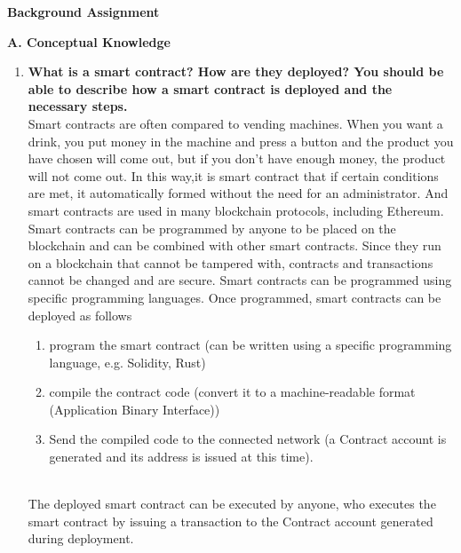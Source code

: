 \documentclass[a4paper,10pt]{jsarticle}
\begin{document}
  \begin{flushright}
    \textbf{\large{Background Assignment}}
  \end{flushright}
  \begin{center}
    \textbf{\large{A. Conceptual Knowledge}}
  \end{center}
  \begin{enumerate}
    \item \textbf{\large{What is a smart contract? How are they deployed? You should be able to describe how a smart contract is deployed and the necessary steps.}}\mbox{}\\
    \newline
    Smart contracts are often compared to vending machines. 
    When you want a drink, you put money in the machine and press a button and the product you have chosen will come out, but if you don't have enough money, the product will not come out.
    In this way,it is smart contract that if certain conditions are met, it automatically formed without the need for an administrator.
    And smart contracts are used in many blockchain protocols, including Ethereum. 
    Smart contracts can be programmed by anyone to be placed on the blockchain and can be combined with other smart contracts. 
    Since they run on a blockchain that cannot be tampered with, contracts and transactions cannot be changed and are secure. 
    Smart contracts can be programmed using specific programming languages. Once programmed, smart contracts can be deployed as follows
    \newline
    \begin{enumerate}[step.1]
      \item program the smart contract (can be written using a specific programming language, e.g. Solidity, Rust)
      \item compile the contract code (convert it to a machine-readable format (Application Binary Interface))
      \item Send the compiled code to the connected network (a Contract account is generated and its address is issued at this time).
    \end{enumerate}\mbox{}\\
    The deployed smart contract can be executed by anyone, who executes the smart contract by issuing a transaction to the Contract account generated during deployment.
    

\end{enumerate}
\end{document}
